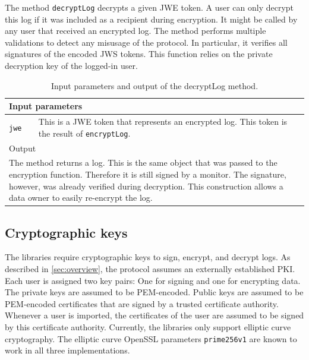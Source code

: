 \documentclass[../main.tex]{subfiles}
\begin{document}
The method \verb|decryptLog| decrypts a given JWE token.
A user can only decrypt this log if it was included as a recipient during encryption.
It might be called by any user that received an encrypted log.
The method performs multiple validations to detect any misusage of the protocol.
In particular, it verifies all signatures of the encoded JWS tokens.
This function relies on the private decryption key of the logged-in user.
\begin{table}[ht]
    \centering
    \begin{tabular}{|p{3cm}p{10cm}|}
        \hline
        \multicolumn{2}{|l|}{Input parameters}    \\ \hline
        \verb|jwe|              & This is a JWE token that represents an encrypted log. This token is the result of \verb|encryptLog|. \\ \hline
            \multicolumn{2}{|l|}{Output}   \\ \hline
        \multicolumn{2}{|p{13cm}|}{The method returns a log. This is the same object that was passed to the encryption function. Therefore it is still signed by a monitor. The signature, however, was already verified during decryption. This construction allows a data owner to easily re-encrypt the log.} \\ \hline
    \end{tabular}
    \caption[Signature of decryptLog]{Input parameters and output of the decryptLog method.}
\end{table}

\subsection{Cryptographic keys}
The libraries require cryptographic keys to sign, encrypt, and decrypt logs.
As described in \cref{sec:overview}, the protocol assumes an externally established PKI.
Each user is assigned two key pairs: 
One for signing and one for encrypting data.
The private keys are assumed to be PEM-encoded.
Public keys are assumed to be PEM-encoded certificates that are signed by a trusted certificate authority.
Whenever a user is imported, the certificates of the user are assumed to be signed by this certificate authority.
Currently, the libraries only support elliptic curve cryptography.
The elliptic curve OpenSSL parameters \verb|prime256v1| are known to work in all three implementations.
\end{document}
